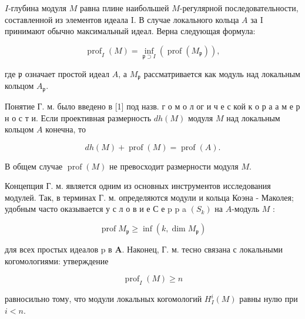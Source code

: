 \documentclass[10pt]{article}
\begin{document}
$I$-глубина модуля $M$ равна плине наибольшей $M$-регулярной последовательности, составленной из элементов идеала I. В случае локального кольца $A$ за I принимают обычно максимальный идеал. Верна следующая формула:



\[

\operatorname{prof}_{I}(M)=\inf _{\mathfrak{p} \supset I}\left(\operatorname{prof}\left(M_{\mathfrak{p}}\right)\right),

\]



где $\mathfrak{p}$ означает простой идеал $A$, а $M_{\mathfrak{p}}$ рассматривается как модуль над локальным кольцом $A_{\mathfrak{p}}$.



Понятие Г. м. было введено в [1] под назв. г о м о л ог и ч е с кой к о р а $а$ м е р н о с т и. Если проективная размерность $d h(M)$ модуля $M$ над локальным кольцом $A$ конечна, то



\[

d h(M)+\operatorname{prof}(M)=\operatorname{prof}(A) .

\]



В общем случае $\operatorname{prof}(M)$ не превосходит размерности модуля $M$.



Концепция Г. м. является одним из основных инструментов исследования модулей. Так, в терминах Г. м. определяются модули и кольца Коэна - Маколея; удобным часто оказывается у с л о в и е С е p p a $\left(S_{k}\right)$ на $A$-модуль $M$ :



\[

\operatorname{prof} M_{\mathfrak{p}} \geqslant \inf \left(k, \operatorname{dim} M_{\mathfrak{p}}\right)

\]



для всех простых идеалов p в $\boldsymbol{A}$. Наконец, Г. м. тесно связана с локальными когомологиями: утверждение



\[

\operatorname{prof}_{I}(M) \geqslant n

\]



равносильно тому, что модули локальных когомологий $H_{I}^{i}(M)$ равны нулю при $i<n$.
\end{document}
